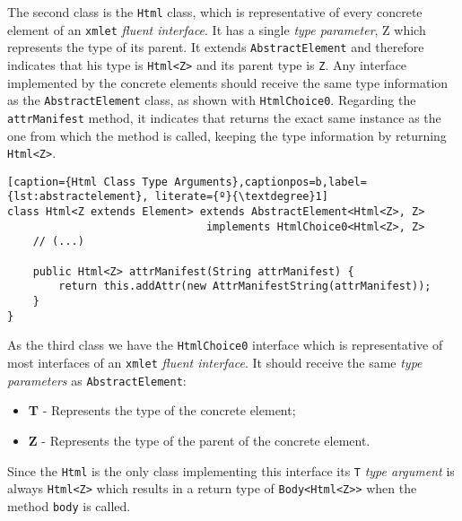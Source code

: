 \noindent
The second class is the \texttt{Html} class, which is representative of every concrete element of an \texttt{xmlet} \textit{fluent interface}. It has a single \textit{type parameter}, Z which represents the type of its parent. It extends \texttt{AbstractElement} and therefore indicates that his type is \texttt{Html<Z>} and its parent type is \texttt{Z}. Any  interface implemented by the concrete elements should receive the same type information as the \texttt{AbstractElement} class, as shown with \texttt{HtmlChoice0}. Regarding the \texttt{attrManifest} method, it indicates that returns the exact same instance as the one from which the method is called, keeping the type information by returning \texttt{Html<Z>}.

\bigskip


\begin{minipage}{\linewidth}
\begin{lstlisting}[caption={Html Class Type Arguments},captionpos=b,label={lst:abstractelement}, literate={º}{\textdegree}1]
class Html<Z extends Element> extends AbstractElement<Html<Z>, Z>
                               implements HtmlChoice0<Html<Z>, Z>
    // (...)
    
    public Html<Z> attrManifest(String attrManifest) {
        return this.addAttr(new AttrManifestString(attrManifest));
    }
}
\end{lstlisting}
\end{minipage}

\noindent
As the third class we have the \texttt{HtmlChoice0} interface which is representative of most interfaces of an \texttt{xmlet} \textit{fluent interface}. It should receive the same \textit{type parameters} as \texttt{AbstractElement}:

\begin{itemize}
	\item \textbf{T} - Represents the type of the concrete element; 
	\item \textbf{Z} - Represents the type of the parent of the concrete element.
\end{itemize}	

\noindent
Since the \texttt{Html} is the only class implementing this interface its \texttt{T} \textit{type argument} is always \texttt{Html<Z>} which results in a return type of \texttt{Body<Html<Z>}\texttt{>} when the method \texttt{body} is called. 

